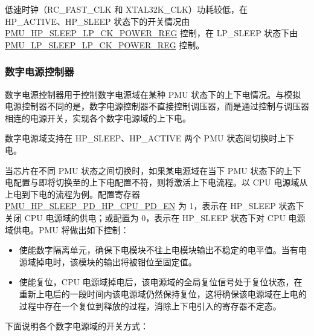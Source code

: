 \documentclass[main\_\_CN.tex]{subfiles}
\begin{document}
低速时钟（RC\_FAST\_CLK 和 XTAL32K\_CLK）功耗较低，在 HP\_ACTIVE、HP\_SLEEP 状态下的开关情况由 \hyperref[regdesc:PMUHPSLEEPLPCKPOWERREG]{PMU\_HP\_SLEEP\_LP\_CK\_POWER\_REG} 控制，在 LP\_SLEEP 状态下由 \hyperref[regdesc:PMULPSLEEPLPCKPOWERREG]{PMU\_LP\_SLEEP\_LP\_CK\_POWER\_REG} 控制。

\subsubsection{数字电源控制器}

数字电源控制器用于控制数字电源域在某种 PMU 状态下的上下电情况。与模拟电源控制器不同的是，数字电源控制器不直接控制调压器，而是通过控制与调压器相连的电源开关，实现各个数字电源域的上下电。

数字电源域支持在 HP\_SLEEP、HP\_ACTIVE 两个 PMU 状态间切换时上下电。

当芯片在不同 PMU 状态之间切换时，如果某电源域在当下 PMU 状态下的上下电配置与即将切换至的上下电配置不符，则将激活上下电流程。以 CPU 电源域从上电到下电的流程为例。配置寄存器 \hyperref[fielddesc:PMUHPSLEEPPDHPCPUPDEN]{PMU\_HP\_SLEEP\_PD\_HP\_CPU\_PD\_EN} 为 1，表示在 HP\_SLEEP 状态下关闭 CPU 电源域的供电；或配置为 0，表示在 HP\_SLEEP 状态下对 CPU 电源域供电。PMU 将做出如下控制：

\begin{itemize}

\item 使能数字隔离单元，确保下电模块不往上电模块输出不稳定的电平值。当有电源域掉电时，该模块的输出将被钳位至固定值。

\item 使能复位，CPU 电源域掉电后，该电源域的全局复位信号处于复位状态，在重新上电后的一段时间内该电源域仍然保持复位，这将确保该电源域在上电的过程中存在一个复位到释放的过程，消除上下电引入的寄存器不定态。

\end{itemize}

下面说明各个数字电源域的开关方式：
\end{document}
